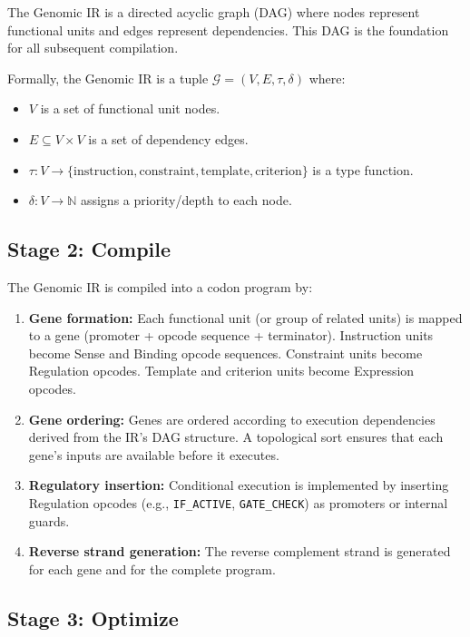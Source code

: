 The Genomic IR is a directed acyclic graph (DAG) where nodes represent functional units and edges represent dependencies. This DAG is the foundation for all subsequent compilation.

\begin{dogmadef}
Formally, the Genomic IR is a tuple $\mathcal{G} = (V, E, \tau, \delta)$ where:
\begin{itemize}[leftmargin=1.5em]
  \item $V$ is a set of functional unit nodes.
  \item $E \subseteq V \times V$ is a set of dependency edges.
  \item $\tau : V \to \{\text{instruction}, \text{constraint}, \text{template}, \text{criterion}\}$ is a type function.
  \item $\delta : V \to \mathbb{N}$ assigns a priority/depth to each node.
\end{itemize}
\end{dogmadef}

\subsection{Stage 2: Compile}
\label{subsec:stage-compile}

The Genomic IR is compiled into a codon program by:
\begin{enumerate}[leftmargin=1.8em]
  \item \textbf{Gene formation:} Each functional unit (or group of related units) is mapped to a gene (promoter + opcode sequence + terminator). Instruction units become Sense and Binding opcode sequences. Constraint units become Regulation opcodes. Template and criterion units become Expression opcodes.
  \item \textbf{Gene ordering:} Genes are ordered according to execution dependencies derived from the IR's DAG structure. A topological sort ensures that each gene's inputs are available before it executes.
  \item \textbf{Regulatory insertion:} Conditional execution is implemented by inserting Regulation opcodes (e.g., \texttt{IF\_ACTIVE}, \texttt{GATE\_CHECK}) as promoters or internal guards.
  \item \textbf{Reverse strand generation:} The reverse complement strand is generated for each gene and for the complete program.
\end{enumerate}

\subsection{Stage 3: Optimize}
\label{subsec:stage-optimize}


